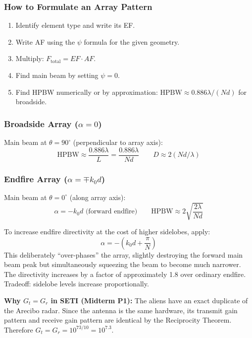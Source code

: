 \documentclass[10pt,letterpaper]{article}
\newcommand{\degrees}{^{\circ}}
\begin{document}
\subsubsection{How to Formulate an Array Pattern}
\begin{enumerate}[noitemsep]
  \item Identify element type and write its EF.
  \item Write AF using the $\psi$ formula for the given geometry.
  \item Multiply: $F_\mathrm{total} = EF\cdot AF$.
  \item Find main beam by setting $\psi = 0$.
  \item Find HPBW numerically or by approximation: $\mathrm{HPBW}\approx 0.886\lambda/(Nd)$ for broadside.
\end{enumerate}

\subsubsection{Broadside Array ($\alpha = 0$)}
Main beam at $\theta = 90\degrees$ (perpendicular to array axis):
\begin{equation}
  \mathrm{HPBW} \approx \frac{0.886\lambda}{L} = \frac{0.886\lambda}{Nd} \qquad D \approx 2(Nd/\lambda)
\end{equation}

\subsubsection{Endfire Array ($\alpha = \mp k_0 d$)}
Main beam at $\theta = 0\degrees$ (along array axis):
\begin{equation}
  \alpha = -k_0 d \text{ (forward endfire)} \qquad \mathrm{HPBW} \approx 2\sqrt{\frac{2\lambda}{Nd}}
\end{equation}

\begin{tcolorbox}[purplebox, title={Hansen-Woodyard Condition for Endfire -- Midterm P2}]
To increase endfire directivity at the cost of higher sidelobes, apply:
\begin{equation}
  \alpha = -\left(k_0 d + \frac{\pi}{N}\right)
\end{equation}
This deliberately ``over-phases'' the array, slightly destroying the forward main beam peak but simultaneously squeezing the beam to become much narrower. The directivity increases by a factor of approximately 1.8 over ordinary endfire. Tradeoff: sidelobe levels increase proportionally.

\textbf{Why $G_t = G_r$ in SETI (Midterm P1):} The aliens have an exact duplicate of the Arecibo radar. Since the antenna is the same hardware, its transmit gain pattern and receive gain pattern are identical by the Reciprocity Theorem. Therefore $G_t = G_r = 10^{73/10} = 10^{7.3}$.
\end{tcolorbox}
\end{document}
